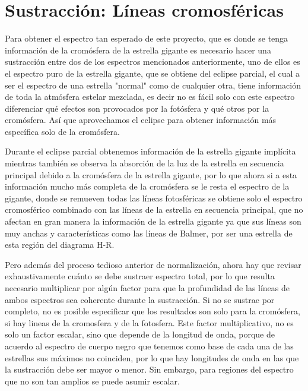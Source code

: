\documentclass[12pt,oneside,openany,letter]{book}
\begin{document}



\section{Sustracción: Líneas cromosféricas}

Para obtener el espectro tan esperado de este proyecto, que es donde se tenga información de la cromósfera de la estrella gigante es necesario hacer una sustracción entre dos de los espectros mencionados anteriormente, uno de ellos es el espectro puro de la estrella gigante, que se obtiene del eclipse parcial, el cual a ser el espectro de una estrella "normal" como de cualquier otra, tiene información de toda la atmósfera estelar mezclada, es decir no es fácil solo con este espectro diferenciar qué efectos son provocados por la fotósfera y qué otros por la cromósfera. Así que aprovechamos el eclipse para obtener información más específica solo de la cromósfera.

Durante el eclipse parcial obtenemos información de la estrella gigante implícita mientras también se observa la absorción de la luz de la estrella en secuencia principal debido a la cromósfera de la estrella gigante, por lo que ahora si a esta información mucho más completa de la cromósfera se le resta el espectro de la gigante, donde se remueven todas las líneas fotosféricas se obtiene solo el espectro cromosférico combinado con las líneas de la estrella en secuencia principal, que no afectan en gran manera la información de la estrella gigante ya que sus líneas son muy anchas y características como las líneas de Balmer, por ser una estrella de esta región del diagrama H-R.

Pero además del proceso tedioso anterior de normalización, ahora hay que revisar exhaustivamente cuánto se debe sustraer espectro total, por lo que resulta necesario multiplicar por algún factor para que la profundidad de las líneas de ambos espectros sea coherente durante la sustracción. Si no se sustrae por completo, no es posible especificar que los resultados son solo para la cromósfera, si hay lineas de la cromosfera y de la fotosfera. Este factor multiplicativo, no es solo un factor escalar, sino que depende de la longitud de onda, porque de acuerdo al espectro de cuerpo negro que tenemos como base de cada una de las estrellas sus máximos no coinciden, por lo que hay longitudes de onda en las que la sustracción debe ser mayor o menor. Sin embargo, para regiones del espectro que no son tan amplios se puede asumir escalar.
\end{document}
